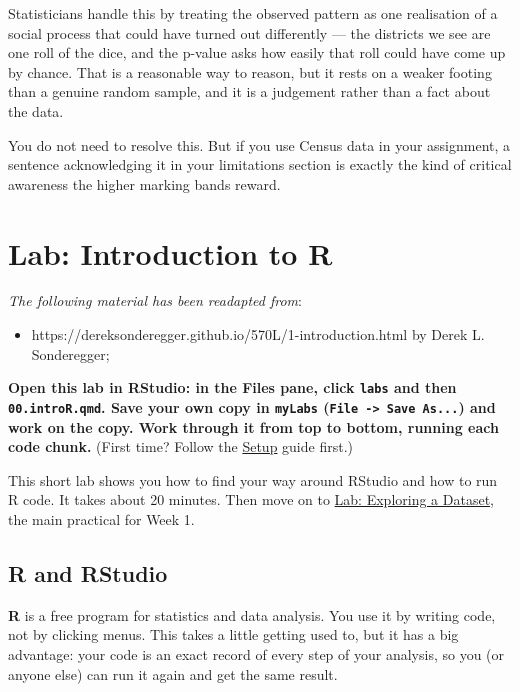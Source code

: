 \documentclass[
  letterpaper,
  DIV=11,
  numbers=noendperiod]{scrreprt}
\providecommand{\tightlist}{%
  \setlength{\itemsep}{0pt}\setlength{\parskip}{0pt}}
\begin{document}
Statisticians handle this by treating the observed pattern as one
realisation of a social process that could have turned out differently
--- the districts we see are one roll of the dice, and the p-value asks
how easily that roll could have come up by chance. That is a reasonable
way to reason, but it rests on a weaker footing than a genuine random
sample, and it is a judgement rather than a fact about the data.

You do not need to resolve this. But if you use Census data in your
assignment, a sentence acknowledging it in your limitations section is
exactly the kind of critical awareness the higher marking bands reward.


\chapter{Lab: Introduction to R}\label{lab-introduction-to-r}

\emph{The following material has been readapted from}:

\begin{itemize}
\tightlist
\item
  https://dereksonderegger.github.io/570L/1-introduction.html by Derek
  L. Sonderegger;
\end{itemize}

\textbf{Open this lab in RStudio: in the Files pane, click \texttt{labs}
and then \texttt{00.introR.qmd}. Save your own copy in \texttt{myLabs}
(\texttt{File\ -\textgreater{}\ Save\ As...}) and work on the copy. Work
through it from top to bottom, running each code chunk.} (First time?
Follow the \hyperref[setup-rstudio-in-your-browser]{Setup} guide first.)

This short lab shows you how to find your way around RStudio and how to
run R code. It takes about 20 minutes. Then move on to
\href{01.DataExploration.qmd}{Lab: Exploring a Dataset}, the main
practical for Week 1.

\section{R and RStudio}\label{r-and-rstudio}

\textbf{R} is a free program for statistics and data analysis. You use
it by writing code, not by clicking menus. This takes a little getting
used to, but it has a big advantage: your code is an exact record of
every step of your analysis, so you (or anyone else) can run it again
and get the same result.
\end{document}
